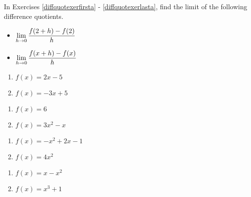 \label{ExercisesforAppDerivatives}
In Exercises \ref{diffquotexerfirsta} - \ref{diffquotexerlasta}, find the limit of the following difference quotients.

\begin{multicols}{2}

\begin{itemize}

\item  $\displaystyle{\lim_{h \rightarrow 0} \dfrac{f(2+h) - f(2)}{h}}$

\item  $\displaystyle{\lim_{h \rightarrow 0} \dfrac{f(x+h) - f(x)}{h}}$

\end{itemize}

\end{multicols}


\begin{multicols}{2}

\begin{enumerate}


\item $f(x) = 2x - 5$ \label{diffquotexerfirsta}
\item $f(x) = -3x + 5$

\setcounter{HW}{\value{enumi}}
\end{enumerate}
\end{multicols}

\begin{multicols}{2}
\begin{enumerate}
\setcounter{enumi}{\value{HW}}

\item $f(x) = 6$
\item $f(x) = 3x^2 - x$

\setcounter{HW}{\value{enumi}}
\end{enumerate}
\end{multicols}

\begin{multicols}{2}
\begin{enumerate}
\setcounter{enumi}{\value{HW}}

\item $f(x) = -x^2 + 2x - 1$
\item  $f(x) = 4x^2$ 

\setcounter{HW}{\value{enumi}}
\end{enumerate}
\end{multicols}

\begin{multicols}{2}
\begin{enumerate}
\setcounter{enumi}{\value{HW}}

\item  $f(x) = x-x^2$ 
\item $f(x) = x^{3} + 1$

\setcounter{HW}{\value{enumi}}
\end{enumerate}
\end{multicols}

